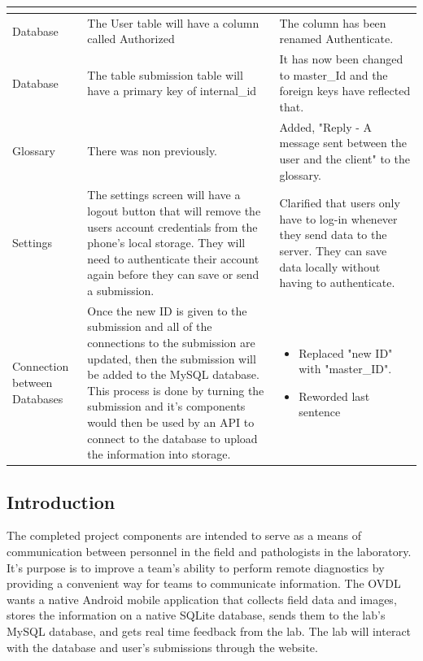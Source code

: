 \documentclass[onecolumn, draftclsnofoot,10pt, compsoc]{IEEEtran}
\begin{document}
\begin{table}
\begin{tabularx}{\textwidth}{|>{\setlength\hsize{.8\hsize}\setlength\linewidth{\hsize}}X|>{\setlength\hsize{1.1\hsize}\setlength\linewidth{\hsize}}X|>{\setlength\hsize{1.1\hsize}\setlength\linewidth{\hsize}}X|}
\begin{itemize}
\end{itemize} 
\\
\hline Database & The User table will have a column called Authorized & The column has been renamed Authenticate. \\
\hline Database & The table submission table will have a primary key of internal\_id & It has now been changed to master\_Id and the foreign keys have reflected that.\\ 
\hline
Glossary & There was non previously. & Added, "Reply - A message sent between the user and the client" to the glossary.\\
\hline
Settings
&
The settings screen will have a logout button that will remove the users account credentials from the phone’s local storage. They will need to authenticate their account again before they can save or send a submission.
&
Clarified that users only have to log-in whenever they send data to the server. They can save data locally without having to authenticate.
 \\
\hline

Connection between Databases
&
Once the new ID is given to the submission and all of the connections to the submission are updated,
then the submission will be added to the MySQL database. This process is done by turning the submission and it’s
components would then be used by an API to connect to the database to upload the information into storage.
&
\begin{itemize}
    \item Replaced "new ID" with "master\_ID".
    \item Reworded last sentence
\end{itemize}
 \\
\hline
\end{tabularx}
\end{table}

\subsection{Introduction}
The completed project components are intended to serve as a means of communication between personnel in the field and pathologists in the laboratory. It's purpose is to improve a team's ability to perform remote diagnostics by providing a convenient way for teams to communicate information. The OVDL wants a native Android mobile application that collects field data and images, stores the information on a native SQLite database, sends them to the lab's MySQL database, and gets real time feedback from the lab. The lab will interact with the database and user's submissions through the website. 
\end{document}
